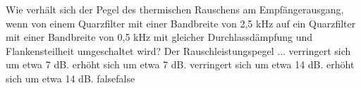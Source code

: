     {Wie verhält sich der Pegel des thermischen Rauschens am Empfängerausgang, wenn von einem Quarzfilter mit einer Bandbreite von 2,5 kHz auf ein Quarzfilter mit einer Bandbreite von 0,5 kHz mit gleicher Durchlassdämpfung und Flankensteilheit umgeschaltet wird? Der Rauschleistungspegel ...}
    {verringert sich um etwa 7 dB.}
    {erhöht sich um etwa 7 dB.}
    {verringert sich um etwa 14 dB.}
    {erhöht sich um etwa 14 dB.}
    {false}{false}